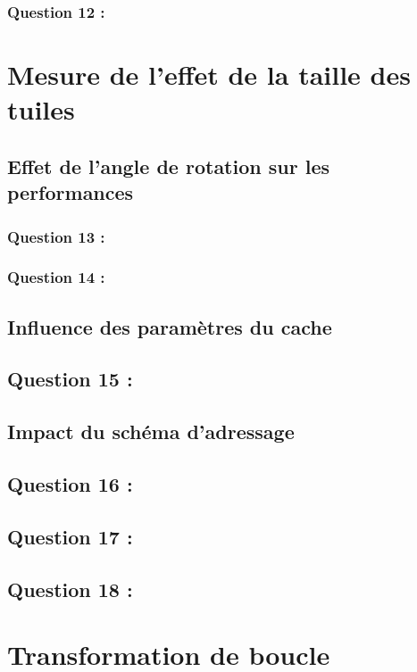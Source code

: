 \documentclass[11pt,a4paper]{article}
\begin{document}
        \subsubsection{Question 12 :}
        
\section{ Mesure de l’effet de la taille des tuiles}
    \subsection{Effet de l’angle de rotation sur les performances}
        \subsubsection{Question 13 :}
        
        \subsubsection{Question 14 :}
        
\subsection{Influence des paramètres du cache}
    \subsection{Question 15 :}
        
\subsection{Impact du schéma d’adressage}
    \subsection{Question 16 :}
        
    \subsection{Question 17 :}
        
    \subsection{Question 18 :}
        
\section{Transformation de boucle}
\end{document}
